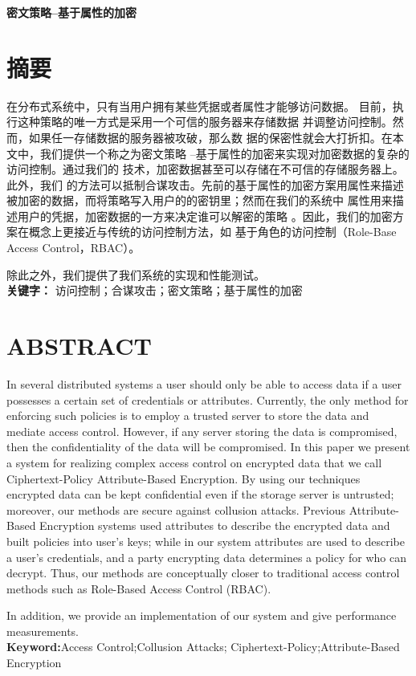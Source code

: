 \centerline{\bfseries 密文策略--基于属性的加密}
\chapter*{摘\qquad 要}
在分布式系统中，只有当用户拥有某些凭据或者属性才能够访问数据。
目前，执行这种策略的唯一方式是采用一个可信的服务器来存储数据
并调整访问控制。然而，如果任一存储数据的服务器被攻破，那么数
据的保密性就会大打折扣。在本文中，我们提供一个称之为密文策略
--基于属性的加密来实现对加密数据的复杂的访问控制。通过我们的
技术，加密数据甚至可以存储在不可信的存储服务器上。此外，我们
的方法可以抵制合谋攻击。先前的基于属性的加密方案用属性来描述
被加密的数据，而将策略写入用户的的密钥里；然而在我们的系统中
属性用来描述用户的凭据，加密数据的一方来决定谁可以解密的策略
。因此，我们的加密方案在概念上更接近与传统的访问控制方法，如
基于角色的访问控制（Role-Base Access Control，RBAC）。\par
除此之外，我们提供了我们系统的实现和性能测试。\\
\textbf{关键字：} 访问控制；合谋攻击；密文策略；基于属性的加密
\clearpage
\chapter*{ABSTRACT}
In several distributed systems a user should only be %
able to access data if a user possesses a certain set of %
credentials or attributes. Currently, the only method %
for enforcing such policies is to employ a trusted server %
to store the data and mediate access control. However, %
if any server storing the data is compromised, then the %
confidentiality of the data will be compromised. In this %
paper we present a system for realizing complex access %
control on encrypted data that we call Ciphertext-Policy %
Attribute-Based Encryption. By using our techniques %
encrypted data can be kept confidential even if the %
storage server is untrusted; moreover, our methods are %
secure against collusion attacks. Previous Attribute-Based %
Encryption systems used attributes to describe %
the encrypted data and built policies into user’s keys;%
while in our system attributes are used to describe a %
user’s credentials, and a party encrypting data determines %
a policy for who can decrypt. Thus, our methods %
are conceptually closer to traditional access control %
methods such as Role-Based Access Control (RBAC).\par
In addition, we provide an implementation of our system %
and give performance measurements.\\
\textbf{Keyword:}Access Control;Collusion Attacks;%
Ciphertext-Policy;Attribute-Based Encryption
